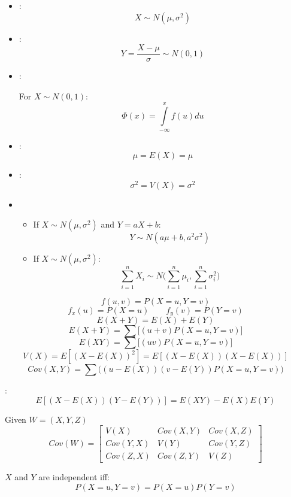 \begin{multicols}{3}
    \begin{itemize}
      \item {}:
        \[
          X \sim N(\mu, \sigma^2)
        \]
      \item {}:
        \[
          Y = \frac{X - \mu}{\sigma} \sim N(0, 1)
        \]
      \item {}:
        \par For $X \sim N(0, 1)$:
        \[
          \Phi(x) = \int\limits_{-\infty}^{x} f(u) du
        \]
      \item {}:
        \[
          \mu = E(X) = \mu
        \]
      \item {}:
        \[
          \sigma^2 = V(X) = \sigma^2
        \]
      \item {}
        \begin{itemize}
          \item If $X \sim N(\mu, \sigma^2)$ and $Y = aX + b$:
            \[
              Y \sim N(a\mu + b, a^2 \sigma^2)
            \]
          \item If $X \sim N(\mu, \sigma^2)$:
            \[
              \sum\limits_{i = 1}^{n} X_i \sim N\bigg( \sum\limits_{i = 1}^{n} \mu_i, \sum\limits_{i = 1}^{n} \sigma_i^2 \bigg)
            \]
        \end{itemize}
    \end{itemize}

      \[
        f(u, v) = P(X = u, Y = v)
      \]
      \[
        f_x(u) = P(X = u) \qquad f_y(v) = P(Y = v)
      \]
      \[
        E(X + Y) = E(X) + E(Y)
      \]
      \[
        E(X + Y) = \sum\bigg[(u + v) P(X = u, Y = v)\bigg]
      \]
      \[
        E(XY) = \sum\bigg[(uv) P(X = u, Y = v)\bigg]
      \]
      \[
        V(X) = E[(X - E(X))^2] = E[(X - E(X))(X - E(X))]
      \]
      \[
        Cov(X, Y) = \sum\bigg((u - E(X)) (v - E(Y)) P(X = u, Y = v)\bigg)
      \]
      \par {}:
        \[
          E[(X - E(X))(Y - E(Y))] = E(XY) - E(X) E(Y)
        \]
      \par Given $W = (X, Y, Z)$
        \[
          Cov(W) =
          \begin{bmatrix}
            V(X)      & Cov(X, Y) & Cov(X, Z) \\
            Cov(Y, X) & V(Y)      & Cov(Y, Z) \\
            Cov(Z, X) & Cov(Z, Y) & V(Z)
          \end{bmatrix}
        \]
      \par $X$ and $Y$ are independent iff:
        \[
          P(X = u, Y = v) = P(X = u) P(Y = v)
        \]
\end{multicols}

